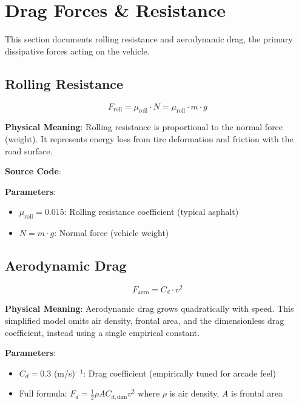 \section{Drag Forces \& Resistance}

This section documents rolling resistance and aerodynamic drag, the primary dissipative forces acting on the vehicle.

\subsection{Rolling Resistance}

\begin{equation}
  F_{\text{roll}} = \mu_{\text{roll}} \cdot N = \mu_{\text{roll}} \cdot m \cdot g
  \label{eq:rolling-resistance}
\end{equation}

\textbf{Physical Meaning}: Rolling resistance is proportional to the normal force (weight). It represents energy loss from tire deformation and friction with the road surface.

\textbf{Source Code}: 

\textbf{Parameters}:
\begin{itemize}
  \item $\mu_{\text{roll}} = 0.015$: Rolling resistance coefficient (typical asphalt)
  \item $N = m \cdot g$: Normal force (vehicle weight)
\end{itemize}

\subsection{Aerodynamic Drag}

\begin{equation}
  F_{\text{aero}} = C_d \cdot v^2
  \label{eq:aerodynamic-drag}
\end{equation}

\textbf{Physical Meaning}: Aerodynamic drag grows quadratically with speed. This simplified model omits air density, frontal area, and the dimensionless drag coefficient, instead using a single empirical constant.

\textbf{Parameters}:
\begin{itemize}
  \item $C_d = 0.3$ (m/s)$^{-1}$: Drag coefficient (empirically tuned for arcade feel)
  \item Full formula: $F_d = \frac{1}{2} \rho A C_{d,\text{dim}} v^2$ where $\rho$ is air density, $A$ is frontal area
\end{itemize}

